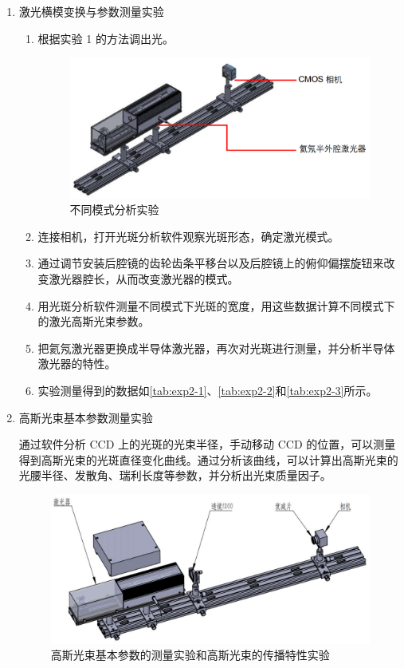 \begin{enumerate}
	\item 激光横模变换与参数测量实验
	\begin{enumerate}
		\item 根据实验 1 的方法调出光。
		
		\begin{figure}[h!]
			\centering
			\includegraphics[width=0.5\linewidth]{images/APL1_8_Exp2}
			\caption{不同模式分析实验}
			\label{fig:apl18exp2}
		\end{figure}
		
		\item 连接相机，打开光斑分析软件观察光斑形态，确定激光模式。
		
		\item 通过调节安装后腔镜的齿轮齿条平移台以及后腔镜上的俯仰偏摆旋钮来改变激光器腔长，从而改变激光器的模式。
		
		\item 用光斑分析软件测量不同模式下光斑的宽度，用这些数据计算不同模式下的激光高斯光束参数。
		
		\item 把氦氖激光器更换成半导体激光器，再次对光斑进行测量，并分析半导体激光器的特性。
		
		\item 实验测量得到的数据如\cref{tab:exp2-1}、\cref{tab:exp2-2}和\cref{tab:exp2-3}所示。
	\end{enumerate}
	
	\item 高斯光束基本参数测量实验
	
	通过软件分析 CCD 上的光斑的光束半径，手动移动 CCD 的位置，可以测量得到高斯光束的光斑直径变化曲线。通过分析该曲线，可以计算出高斯光束的光腰半径、发散角、瑞利长度等参数，并分析出光束质量因子。
	
	\begin{figure}[h!]
		\centering
		\includegraphics[width=0.5\linewidth]{images/APL1_8_Exp34}
		\caption{高斯光束基本参数的测量实验和高斯光束的传播特性实验}
		\label{fig:apl18exp34}
	\end{figure}
	

\end{enumerate}
